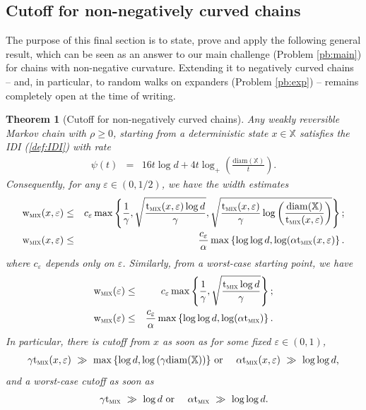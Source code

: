 \documentclass[12pt,final]{article}
\newtheorem{theorem}{Theorem}[section]
\numberwithin{equation}{section}
\newcommand{\dX}{\mathbb{X}}
\newcommand{\tmix}{{\rm t}_{\textsc{mix}}}
\newcommand{\wmix}{{\rm w}_{\textsc{mix}}}
\newcommand{\diam}{\mathrm{diam}}
\begin{document}
\subsection{Cutoff for non-negatively curved chains}
The purpose of this final section is to state, prove and apply the following general result, which can be seen as an answer to our main challenge (Problem \ref{pb:main}) for chains with non-negative curvature.  Extending it to negatively curved chains -- and, in particular, to random walks on expanders (Problem \ref{pb:exp}) -- remains completely open at the time of writing.
\begin{theorem}[Cutoff for non-negatively curved chains]Any weakly reversible Markov chain with $\rho\ge 0$, starting from a  deterministic state $x\in\dX$  satisfies the IDI (\ref{def:IDI}) with rate  
\begin{eqnarray*}
\psi(t) & = & 16t\log d+4t\log_+\left(\frac{\diam(\dX)}{t}\right).
\end{eqnarray*}
Consequently, for any  $\varepsilon\in (0,1/2)$, we have the width estimates
\begin{eqnarray*}
\wmix(x,\varepsilon) & \le & c_\varepsilon\max\left\{\frac{1}{\gamma},\sqrt{\frac{\tmix(x,\varepsilon)\log d}{\gamma}},\sqrt{\frac{\tmix(x,\varepsilon)}{\gamma}\log\left(\frac{\diam(\dX)}{\tmix(x,\varepsilon)}\right)}\right\};\\
\wmix(x,\varepsilon) & \le & \frac{c_\varepsilon}{\alpha}\max\left\{\log\log d,\log(\alpha\tmix(x,\varepsilon)\right\}.
\end{eqnarray*}
 where $c_\varepsilon$ depends only on $\varepsilon$. 
Similarly, from a worst-case starting point, we have
\begin{eqnarray*}
\wmix(\varepsilon) & \le & c_\varepsilon\max\left\{\frac{1}{\gamma},\sqrt{\frac{\tmix \log d}{\gamma}}\right\};\\
\wmix(\varepsilon) & \le & \frac{c_\varepsilon}{\alpha}\max\left\{\log\log d,\log(\alpha\tmix)\right\}.
\end{eqnarray*}
In particular, there is cutoff from $x$ as soon as  for some fixed $\varepsilon\in(0,1)$,
\begin{eqnarray*}
\gamma\tmix(x,\varepsilon) \ \gg \ \max\left\{\log d,\log\left(\gamma\diam(\dX)\right)\right\} & \textrm{ or } & \alpha\tmix(x,\varepsilon) \ \gg \ {\log \log d},
\end{eqnarray*}
and a worst-case cutoff as soon as 
\begin{eqnarray*}
\gamma\tmix \ \gg \ \log d & \textrm{ or } & \alpha\tmix \ \gg \ {\log \log d}.
\end{eqnarray*}
\end{theorem}
\end{document}
